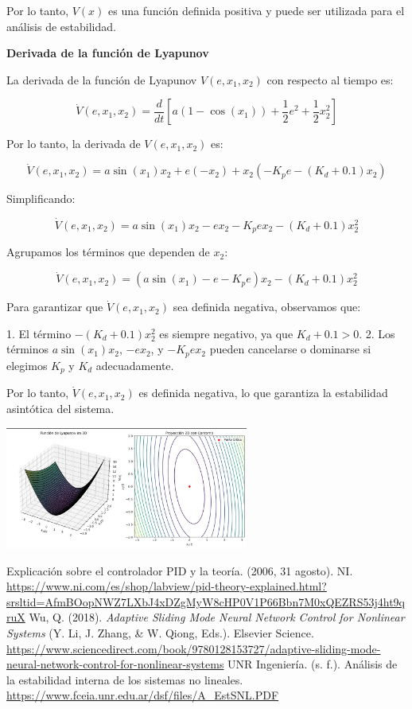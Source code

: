 \documentclass[fleqn,letterpaper,12pt]{article}
\begin{document}
Por lo tanto, \( V(x) \) es una función definida positiva y puede ser utilizada para el análisis de estabilidad.

\textbf{Derivada de la función de Lyapunov}

La derivada de la función de Lyapunov \( V(e, x_1, x_2) \) con respecto al tiempo es:
\vspace{-7mm}

\[
\dot{V}(e, x_1, x_2) = \frac{d}{dt} \left[ a(1 - \cos(x_1)) + \frac{1}{2} e^2 + \frac{1}{2} x_2^2 \right]
\]

Por lo tanto, la derivada de \( V(e, x_1, x_2) \) es:
\vspace{-9mm}

\[
\dot{V}(e, x_1, x_2) = a \sin(x_1) x_2 + e (-x_2) + x_2 (-K_p e - (K_d + 0.1) x_2)
\]

Simplificando:
\vspace{-9mm}

\[
\dot{V}(e, x_1, x_2) = a \sin(x_1) x_2 - e x_2 - K_p e x_2 - (K_d + 0.1) x_2^2
\]

Agrupamos los términos que dependen de \( x_2 \):
\vspace{-9mm}

\[
\dot{V}(e, x_1, x_2) = \left( a \sin(x_1) - e - K_p e \right) x_2 - (K_d + 0.1) x_2^2
\]


Para garantizar que \( \dot{V}(e, x_1, x_2) \) sea definida negativa, observamos que:

1. El término \( - (K_d + 0.1) x_2^2 \) es siempre negativo, ya que \( K_d + 0.1 > 0 \).
2. Los términos \( a \sin(x_1) x_2 \), \( -e x_2 \), y \( -K_p e x_2 \) pueden cancelarse o dominarse si elegimos \( K_p \) y \( K_d \) adecuadamente.

Por lo tanto, \( \dot{V}(e, x_1, x_2) \) es definida negativa, lo que garantiza la estabilidad asintótica del sistema.

\includegraphics[width=0.6\textwidth]{grafica2.jpeg}

\renewcommand{\refname}{Bibliografía}
\begin{thebibliography}{9}
     Explicación sobre el controlador PID y la teoría. (2006, 31 agosto). NI. \url{https://www.ni.com/es/shop/labview/pid-theory-explained.html?srsltid=AfmBOopNWZ7LXbJ4xDZgMyW8cHP0V1P66Bbn7M0xQEZRS53j4ht9qruX}
     Wu, Q. (2018). \emph{Adaptive Sliding Mode Neural Network Control for Nonlinear Systems} (Y. Li, J. Zhang, \& W. Qiong, Eds.). Elsevier Science. \url{https://www.sciencedirect.com/book/9780128153727/adaptive-sliding-mode-neural-network-control-for-nonlinear-systems}
     UNR Ingeniería. (s. f.). Análisis de la estabilidad interna de los sistemas no lineales. \url{https://www.fceia.unr.edu.ar/dsf/files/A_EstSNL.PDF}
\end{thebibliography}
\end{document}
